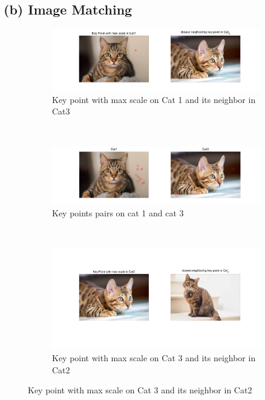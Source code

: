 \documentclass[12pt]{article}
\begin{document}
		\subsection*{(b) Image Matching}
				\begin{figure}[H]
				\centering 
				\begin{subfigure}{\textwidth}
					\centering
					\includegraphics[width=\textwidth]{i11.png}
					\caption{Key point with max scale on Cat 1 and its neighbor in Cat3}
					\label{fig:cat1maxcat3}
				\end{subfigure}
			\\
				\hfill
				\begin{subfigure}{\textwidth}
					\centering
					\includegraphics[width=\textwidth]{i12.png}
					\caption{Key points pairs on cat 1 and cat 3}
					\label{fig:cat1cat3}
				\end{subfigure}
			\\
			\hfill
			\begin{subfigure}{\textwidth}
				\centering
				\includegraphics[width=\textwidth]{i21.png}
				\caption{Key point with max scale on Cat 3 and its neighbor in Cat2}

\end{subfigure}
\end{figure}
\end{document}
